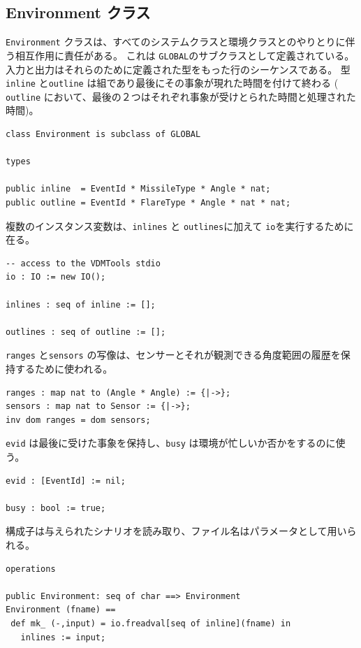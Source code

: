 \documentclass[\pformat,12pt]{jreport}
\begin{document}
\subsection{Environment クラス}

 \texttt{Environment} クラスは、すべてのシステムクラスと環境クラスとのやりとりに伴う相互作用に責任がある。
これは \texttt{GLOBAL}のサブクラスとして定義されている。 
入力と出力はそれらのために定義された型をもった行のシーケンスである。
型 \texttt{inline} と\texttt{outline} は組であり最後にその事象が現れた時間を付けて終わる ( \texttt{outline} において、最後の２つはそれぞれ事象が受けとられた時間と処理された時間)。

\begin{lstlisting}
class Environment is subclass of GLOBAL

types

public inline  = EventId * MissileType * Angle * nat;
public outline = EventId * FlareType * Angle * nat * nat;
\end{lstlisting}

複数のインスタンス変数は、\texttt{inlines} と \texttt{outlines}に加えて \texttt{io}を実行するために在る。
\begin{lstlisting}
-- access to the VDMTools stdio
io : IO := new IO();

inlines : seq of inline := [];

outlines : seq of outline := [];
\end{lstlisting}

\texttt{ranges}  と\texttt{sensors} の写像は、センサーとそれが観測できる角度範囲の履歴を保持するために使われる。

\begin{lstlisting}
ranges : map nat to (Angle * Angle) := {|->};
sensors : map nat to Sensor := {|->};
inv dom ranges = dom sensors;
\end{lstlisting}

\texttt{evid} は最後に受けた事象を保持し、\texttt{busy} は環境が忙しいか否かをするのに使う。

\begin{lstlisting}
evid : [EventId] := nil;

busy : bool := true;
\end{lstlisting}

構成子は与えられたシナリオを読み取り、ファイル名はパラメータとして用いられる。

\begin{lstlisting}
operations

public Environment: seq of char ==> Environment
Environment (fname) ==
 def mk_ (-,input) = io.freadval[seq of inline](fname) in
   inlines := input;
\end{lstlisting}
\end{document}
